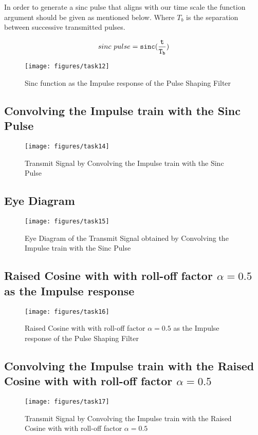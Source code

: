 \documentclass[a4paper,11pt]{article}%
\begin{document}
In order to generate  a sinc pulse that aligns with our time scale the function argument should be given as mentioned below. Where $T_b$ is the separation between
successive transmitted pulses.

\[
sinc~pulse = {\tt sinc(\frac{t}{T_b})}
\]
\begin{figure}[H]
	\centering
	\texttt{[image: figures/task12]}
	\caption{Sinc function as the Impulse response of the Pulse Shaping Filter}
\end{figure}

\subsection{Convolving the Impulse train with the Sinc Pulse}

\begin{figure}[H]
	\centering
	\texttt{[image: figures/task14]}
	\caption{Transmit Signal by Convolving the Impulse train with the Sinc Pulse}
\end{figure}

\subsection{Eye Diagram}

\begin{figure}[H]
	\centering
	\texttt{[image: figures/task15]}
	\caption{Eye Diagram of the Transmit Signal obtained by Convolving the Impulse train with the Sinc Pulse}
\end{figure}

\subsection{Raised Cosine with with roll-off factor $\alpha = 0.5$ as the Impulse response}

\begin{figure}[H]
	\centering
	\texttt{[image: figures/task16]}
	\caption{Raised Cosine with with roll-off factor $\alpha = 0.5$ as the Impulse response of the Pulse Shaping Filter}
\end{figure}

\subsection{Convolving the Impulse train with the Raised Cosine with with roll-off factor $\alpha = 0.5$}

\begin{figure}[H]
	\centering
	\texttt{[image: figures/task17]}
	\caption{Transmit Signal by Convolving the Impulse train with the Raised Cosine with with roll-off factor $\alpha = 0.5$}
\end{figure}
\end{document}
